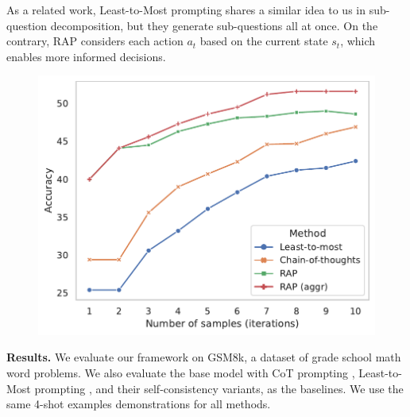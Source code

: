 
As a related work, Least-to-Most prompting \cite{zhou2022least} shares a similar idea to us in sub-question decomposition, but they generate sub-questions all at once. On the contrary, RAP considers each action $a_t$ based on the current state $s_t$, which enables more informed decisions.


\begin{figure}
\centering
\includegraphics[width=0.8\linewidth]{sections/rap_results.pdf}
\vspace{-8pt}
\label{fig:gsm8k-n_sample}
\vspace{-12pt}
\end{figure}




\noindent \textbf{Results.}
We evaluate our framework on GSM8k, a dataset of grade school math word problems. We also evaluate the base model with CoT prompting \cite{wei2022chain}, Least-to-Most prompting \cite{zhou2022least}, and their self-consistency \cite{wang2022self} variants, as the baselines. 
We use the same 4-shot examples demonstrations for all methods. %

